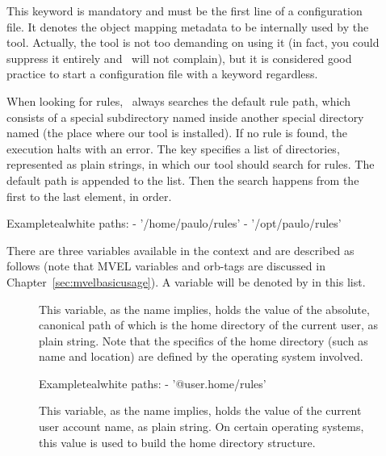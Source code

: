 \begin{description}
\item[] This keyword is mandatory and must be the first line of a configuration file. It denotes the object mapping metadata to be internally used by the tool. Actually, the tool is not too demanding on using it (in fact, you could suppress it entirely and \arara\ will not complain), but it is considered good practice to start a configuration file with a  keyword regardless.

\item[] When looking for rules, \arara\ always searches the default rule path, which consists of a special subdirectory named  inside another special directory named  (the place where our tool is installed). If no rule is found, the execution halts with an error. The  key specifies a list of directories, represented as plain strings, in which our tool should search for rules. The default path is appended to the list. Then the search happens from the first to the last element, in order.

\begin{codebox}{Example}{teal}{\icnote}{white}
paths:
- '/home/paulo/rules'
- '/opt/paulo/rules'
\end{codebox}

There are three variables available in the  context and are described as follows (note that \gls{MVEL} variables and \glspl{orb-tag} are discussed in Chapter~\ref{sec:mvelbasicusage}). A variable will be denoted by  in this list.

\begin{description}
\item[] This variable, as the name implies, holds the value of the absolute, canonical path of  which is the home directory of the current user, as plain string. Note that the specifics of the home directory (such as name and location) are defined by the operating system involved.

\begin{codebox}{Example}{teal}{\icnote}{white}
paths:
- '@{user.home}/rules'
\end{codebox}

\item[] This variable, as the name implies, holds the value of the current user account name, as plain string. On certain operating systems, this value is used to build the home directory structure.


\end{description}
\end{description}
